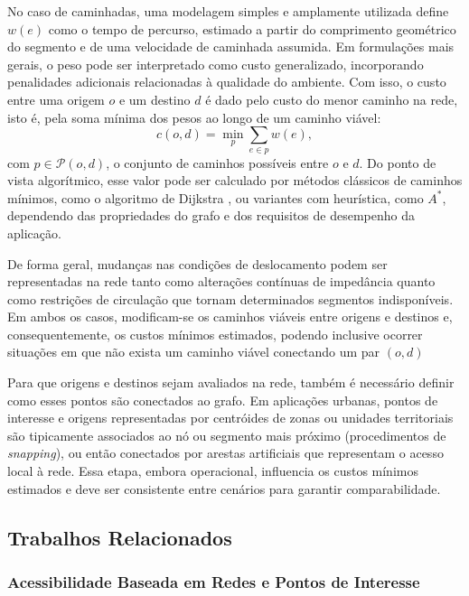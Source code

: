 No caso de caminhadas, uma modelagem simples e amplamente utilizada define $w(e)$ como o tempo de percurso, estimado a partir do comprimento geométrico do segmento e de uma velocidade de caminhada assumida. Em formulações mais gerais, o peso pode ser interpretado como custo generalizado, incorporando penalidades adicionais relacionadas à qualidade do ambiente. Com isso, o custo entre uma origem $o$ e um destino $d$ é dado pelo custo do menor caminho na rede, isto é, pela soma mínima dos pesos ao longo de um caminho viável:
\begin{equation}
    c(o,d) = \min_{p} \sum_{e \in p} w(e),
\end{equation}
com $p \in \mathcal{P}(o,d)$, o conjunto de caminhos possíveis entre $o$ e $d$. Do ponto de vista algorítmico, esse valor pode ser calculado por métodos clássicos de caminhos mínimos, como o algoritmo de Dijkstra \cite{cormen01introduction}, ou variantes com heurística, como $A^*$, dependendo das propriedades do grafo e dos requisitos de desempenho da aplicação.

De forma geral, mudanças nas condições de deslocamento podem ser representadas na rede tanto como alterações contínuas de impedância quanto como restrições de circulação que tornam determinados segmentos indisponíveis. Em ambos os casos, modificam-se os caminhos viáveis entre origens e destinos e, consequentemente, os custos mínimos estimados, podendo inclusive ocorrer situações em que não exista um caminho viável conectando um par $(o,d)$

Para que origens e destinos sejam avaliados na rede, também é necessário definir como esses pontos são conectados ao grafo. Em aplicações urbanas, pontos de interesse e origens representadas por centróides de zonas ou unidades territoriais são tipicamente associados ao nó ou segmento mais próximo (procedimentos de \textit{snapping}), ou então conectados por arestas artificiais que representam o acesso local à rede. Essa etapa, embora operacional, influencia os custos mínimos estimados e deve ser consistente entre cenários para garantir comparabilidade.

\subsection{Trabalhos Relacionados}

\subsubsection{Acessibilidade Baseada em Redes e Pontos de Interesse}

